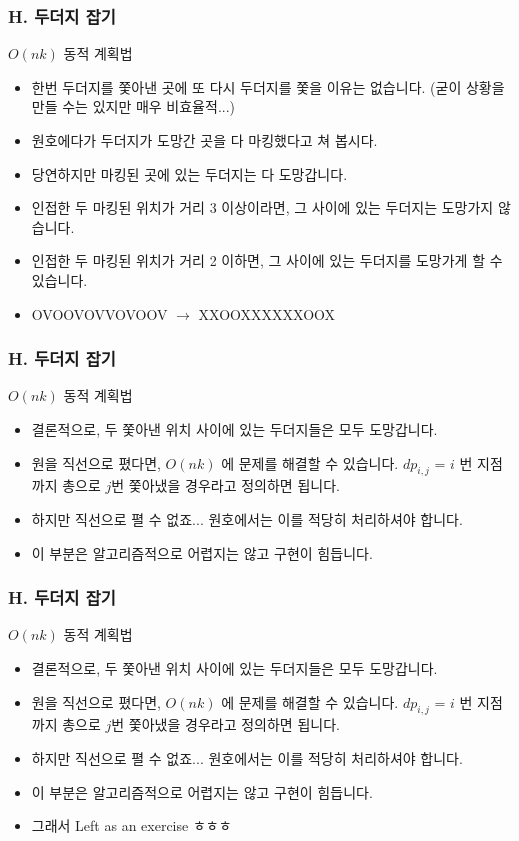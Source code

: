 \documentclass{beamer}
\begin{document}
\begin{frame}
	\frametitle{H. 두더지 잡기}
	\begin{block}{$O(nk)$ 동적 계획법}
		\begin{itemize}
			\item 한번 두더지를 쫓아낸 곳에 또 다시 두더지를 쫓을 이유는 없습니다. (굳이 상황을 만들 수는 있지만 매우 비효율적...)
			\item 원호에다가 두더지가 도망간 곳을 다 마킹했다고 쳐 봅시다.
			\item 당연하지만 마킹된 곳에 있는 두더지는 다 도망갑니다.
			\item 인접한 두 마킹된 위치가 거리 3 이상이라면, 그 사이에 있는 두더지는 도망가지 않습니다.
			\item 인접한 두 마킹된 위치가 거리 2 이하면, 그 사이에 있는 두더지를 도망가게 할 수 있습니다.
			\item OVOOVOVVOVOOV $\rightarrow$ XXOOXXXXXXOOX
		\end{itemize}
	\end{block}
\end{frame}

\begin{frame}
	\frametitle{H. 두더지 잡기}
	\begin{block}{$O(nk)$ 동적 계획법}
		\begin{itemize}
			\item 결론적으로, 두 쫓아낸 위치 사이에 있는 두더지들은 모두 도망갑니다. 
			\item 원을 직선으로 폈다면, $O(nk)$ 에 문제를 해결할 수 있습니다. $dp_{i, j}$ = $i$ 번 지점까지 총으로 $j$번 쫓아냈을 경우라고 정의하면 됩니다.
			\item 하지만 직선으로 펼 수 없죠... 원호에서는 이를 적당히 처리하셔야 합니다. 
			\item 이 부분은 알고리즘적으로 어렵지는 않고 구현이 힘듭니다. 
		\end{itemize}
	\end{block}
\end{frame}

\begin{frame}
	\frametitle{H. 두더지 잡기}
	\begin{block}{$O(nk)$ 동적 계획법}
		\begin{itemize}
			\item 결론적으로, 두 쫓아낸 위치 사이에 있는 두더지들은 모두 도망갑니다. 
			\item 원을 직선으로 폈다면, $O(nk)$ 에 문제를 해결할 수 있습니다. $dp_{i, j}$ = $i$ 번 지점까지 총으로 $j$번 쫓아냈을 경우라고 정의하면 됩니다.
			\item 하지만 직선으로 펼 수 없죠... 원호에서는 이를 적당히 처리하셔야 합니다. 
			\item 이 부분은 알고리즘적으로 어렵지는 않고 구현이 힘듭니다. 
			\item 그래서 Left as an exercise ㅎㅎㅎ	
	\end{itemize}
	\end{block}
\end{frame}
\end{document}

